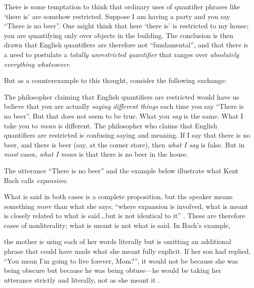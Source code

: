 \documentclass[11pt]{article}
\newenvironment{squote}{%
\begin{spacing}{1}
       	\begin{list}{}{%
\setlength{\labelwidth}{0pt}%
\rightmargin\leftmargin%
}
\item\relax
}{%
\end{list}%
\end{spacing}
}
\begin{document}
\begin{spacing}{1.25}
There is some temptation to think that ordinary uses of quantifier
phrases like `there is' are somehow restricted.  Suppose I am having a
party and you say ``There is no beer''.  One might think that here
`there is' is restricted to my house; you are quantifying only over
objects in the building.  The conclusion is then drawn that English
quantifiers are therefore not ``fundamental'', and that there is a
need to postulate a {\em totally unrestricted quantifier} that ranges
over {\em absolutely everything whatsoever}.

But as a counterexample to this thought, consider the following
exchange:







The philosopher claiming that English quantifiers are restricted would
have us believe that you are actually {\em saying different things}
each time you say ``There is no beer''.  But that does not seem to be
true.  What you {\em say} is the same.  What I take you to {\em mean}
is different.  The philosopher who claims that English quantifiers are
restricted is confusing saying and meaning.  If I say that there is no
beer, and there is beer (say, at the corner store), then {\em what I
  say} is false.  But in {\em most} cases, {\em what I mean} is that
there is no beer in the house.

The utterance ``There is no beer'' and the example below illustrate
what Kent Bach calls {\em expansion}:


What is said in both cases is a complete proposition, but the speaker
means something {\em more} than what she says; ``where expansion is
involved, what is meant is closely related to what is said\,\ldots but
is not identical to it'' \citep{bach1994}.  These are therefore cases
of nonliterality; what is meant is not what is said.  In Bach's
example,

\begin{squote}
the mother is using each of her words literally but is omitting an
additional phrase that could have made what she meant fully explicit.
If her son had replied, ``You mean I'm going to live forever, Mom?'',
it would not be because she was being obscure but because he was being
obtuse---he would be taking her utterance strictly and literally, not
as she meant it \citeyearpar{bach1994}.
\end{squote}


\end{spacing}
\end{document}

